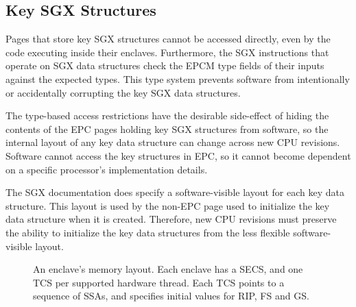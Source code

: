 \subsection{Key SGX Structures}
\label{sec:key_structures}


Pages that store key SGX structures cannot be accessed directly, even by the
code executing inside their enclaves. Furthermore, the SGX instructions that
operate on SGX data structures check the EPCM type fields of their inputs
against the expected types. This type system prevents software from
intentionally or accidentally corrupting the key SGX data structures.

The type-based access restrictions have the desirable side-effect of hiding the
contents of the EPC pages holding key SGX structures from software, so the
internal layout of any key data structure can change across new CPU revisions.
Software cannot access the key structures in EPC, so it cannot become dependent
on a specific processor's implementation details.

The SGX documentation does specify a software-visible layout for each key data
structure. This layout is used by the non-EPC page used to initialize the key
data structure when it is created. Therefore, new CPU revisions must preserve
the ability to initialize the key data structures from the less flexible
software-visible layout.

\begin{figure}[hbt!]
  \caption{
    An enclave's memory layout. Each enclave has a SECS, and one TCS per
    supported hardware thread. Each TCS points to a sequence of SSAs, and
    specifies initial values for RIP, FS and GS.
  }
  \label{fig:enclave_layout}
\end{figure}

